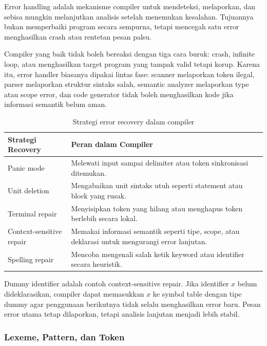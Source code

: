 \begin{jawab}
Error handling adalah mekanisme compiler untuk mendeteksi, melaporkan, dan sebisa mungkin melanjutkan analisis setelah menemukan kesalahan. Tujuannya bukan memperbaiki program secara sempurna, tetapi mencegah satu error menghasilkan crash atau rentetan pesan palsu.
\end{jawab}

Compiler yang baik tidak boleh bereaksi dengan tiga cara buruk: crash, infinite loop, atau menghasilkan target program yang tampak valid tetapi korup. Karena itu, error handler biasanya dipakai lintas fase: scanner melaporkan token ilegal, parser melaporkan struktur sintaks salah, semantic analyzer melaporkan type atau scope error, dan code generator tidak boleh menghasilkan kode jika informasi semantik belum aman.

\begin{table}[H]
\centering
\begin{tabularx}{\textwidth}{|L{0.26\textwidth}|X|}
\hline
\textbf{Strategi Recovery} & \textbf{Peran dalam Compiler} \\
\hline
Panic mode & Melewati input sampai delimiter atau token sinkronisasi ditemukan. \\
\hline
Unit deletion & Mengabaikan unit sintaks utuh seperti statement atau block yang rusak. \\
\hline
Terminal repair & Menyisipkan token yang hilang atau menghapus token berlebih secara lokal. \\
\hline
Context-sensitive repair & Memakai informasi semantik seperti tipe, scope, atau deklarasi untuk mengurangi error lanjutan. \\
\hline
Spelling repair & Mencoba mengenali salah ketik keyword atau identifier secara heuristik. \\
\hline
\end{tabularx}
\caption{Strategi error recovery dalam compiler}
\label{tab:error-handling-compiler}
\end{table}

Dummy identifier adalah contoh context-sensitive repair. Jika identifier $x$ belum dideklarasikan, compiler dapat memasukkan $x$ ke symbol table dengan tipe dummy agar penggunaan berikutnya tidak selalu menghasilkan error baru. Pesan error utama tetap dilaporkan, tetapi analisis lanjutan menjadi lebih stabil.

\subsubsection{Lexeme, Pattern, dan Token}


